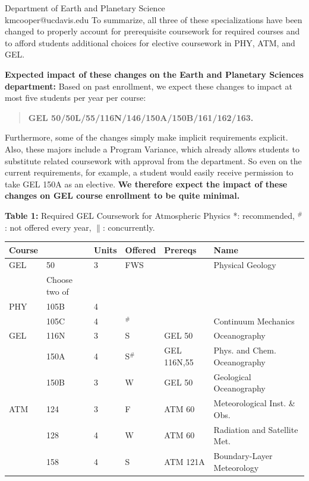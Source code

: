 \documentclass[letterpaper,12pt]{letter}
\begin{document}
\begin{letter}{Department of Earth and  Planetary Science \\ kmcooper@ucdavis.edu}
To summarize, all three of these specializations have been changed to
properly account for prerequisite coursework for required courses and
to afford students additional choices for elective coursework in PHY,
ATM, and GEL.  

{\bf Expected impact of these changes on the Earth and Planetary Sciences department:}
Based on past enrollment, we expect these changes to impact at most
five students per year per course:
\begin{quote}
  {\bf GEL 50/50L/55/116N/146/150A/150B/161/162/163.}
\end{quote}
Furthermore, some of the changes simply make implicit requirements
explicit.  Also, these majors include a Program Variance, which
already allows students to substitute related coursework with approval
from the department.  So even on the current requirements, for
example, a student would easily receive permission to take GEL 150A as
an elective.  {\bf We therefore expect the impact of these changes on
  GEL course enrollment to be quite minimal.}

\newpage

{\bf Table 1:}  Required GEL Coursework for Atmospheric Physics
\vskip 0.25cm
\noindent
*: recommended, $^\#$: not offered every year, $\parallel$: concurrently.\\
\begin{tabular}{|llllll|}
\hline
Course & & Units & Offered & Prereqs & Name \\
\hline
GEL & 50     & 3 & FWS & & Physical Geology \\
\hline
\hline
    & Choose two of & & & & \\
\hline
PHY  & 105B   & 4 & & & \\
     & 105C   & 4 & $^\#$  &             & Continuum Mechanics\\
GEL  & 116N   & 3 & S  & GEL 50      & Oceanography\\
     & 150A   & 4 & S$^\#$ & GEL 116N,55 & Phys. and Chem. Oceanography\\
     & 150B   & 3 & W  & GEL 50      & Geological Oceanography\\
ATM  & 124    & 3 & F  & ATM 60      & Meteorological Inst. \& Obs. \\
     & 128    & 4 & W  & ATM 60      & Radiation and Satellite Met. \\
     & 158    & 4 & S  & ATM 121A    & Boundary-Layer Meteorology \\
\hline
\end{tabular}\\


\end{letter}
\end{document}
